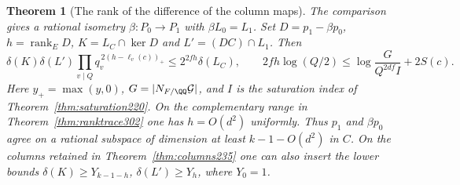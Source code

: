 \documentclass[a4paper,11pt]{article}
\newtheorem{theorem}[proposition]{Theorem}
\theoremstyle{definition}
\theoremstyle{remark}
\numberwithin{equation}{section}
\begin{document}
\begin{theorem}[The rank of the difference of the column maps]\leavevmode
\label{thm:rationalrank302}
The comparison gives a rational isometry \(\beta:P_0\to P_1\)
with \(\beta L_0=L_1\). Set \(D=p_1-\beta p_0\),
\(h=\operatorname{rank}_E D\), \(K=L_C\cap\ker D\) and
\(L'=(DC)\cap L_1\). Then
\[
 \delta(K)\delta(L')\prod_{v\mid Q}q_v^{\,2(h-\ell_v(c))_+}
       \le 2^{2fh}\delta(L_C),\qquad
 2fh\log(Q/2)\le\log\!\frac{G}{Q^{2df}I}+2S(c).
\]
Here \(y_+=\max(y,0)\), \(G=|N_{F/\QQ}\mathcal G|\),
and \(I\) is the saturation index of Theorem~\ref{thm:saturation220}.
On the complementary range in Theorem~\ref{thm:ranktrace302}
one has \(h=O(d^2)\) uniformly. Thus \(p_1\) and \(\beta p_0\)
agree on a rational subspace of dimension at least
\(k-1-O(d^2)\) in \(C\). On the columns retained in
Theorem~\ref{thm:columns235} one can also insert the lower
bounds \(\delta(K)\ge Y_{k-1-h}\), \(\delta(L')\ge Y_h\),
where \(Y_0=1\).
\end{theorem}
\end{document}
